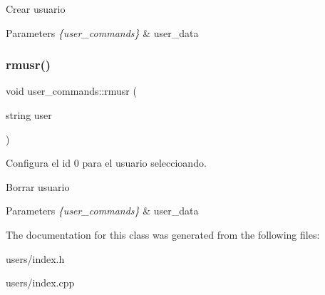 Crear usuario 
\begin{DoxyParams}{Parameters}
{\em \{user\+\_\+commands\}} & user\+\_\+data \\
\hline
\end{DoxyParams}
\mbox{\label{classuser__commands_a1dc49969dc241f97636ec3680c822e3d}} 
\subsubsection{\texorpdfstring{rmusr()}{rmusr()}}
{\footnotesize\ttfamily void user\+\_\+commands\+::rmusr (\begin{DoxyParamCaption}\item[{string}]{user }\end{DoxyParamCaption})}



Configura el id 0 para el usuario seleccioando. 

Borrar usuario 
\begin{DoxyParams}{Parameters}
{\em \{user\+\_\+commands\}} & user\+\_\+data \\
\hline
\end{DoxyParams}


The documentation for this class was generated from the following files\+:\begin{DoxyCompactItemize}
\item 
users/index.\+h\item 
users/index.\+cpp\end{DoxyCompactItemize}
